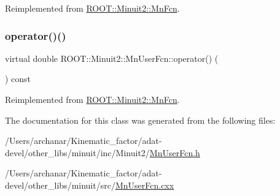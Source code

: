 Reimplemented from \mbox{\hyperlink{classROOT_1_1Minuit2_1_1MnFcn_a61a5f3cd53f1d7daa96bae19f4b1dbb6}{R\+O\+O\+T\+::\+Minuit2\+::\+Mn\+Fcn}}.

\mbox{\label{classROOT_1_1Minuit2_1_1MnUserFcn_aad007634c740a70ebb8f5acb0a7cfede}} 
\subsubsection{\texorpdfstring{operator()()}{operator()()}\hspace{0.1cm}{\footnotesize\ttfamily [3/3]}}
{\footnotesize\ttfamily virtual double R\+O\+O\+T\+::\+Minuit2\+::\+Mn\+User\+Fcn\+::operator() (\begin{DoxyParamCaption}\item[{const \mbox{\hyperlink{namespaceROOT_1_1Minuit2_a62ed97730a1ca8d3fbaec64a19aa11c9}{Mn\+Algebraic\+Vector}} \&}]{ }\end{DoxyParamCaption}) const\hspace{0.3cm}{\ttfamily [virtual]}}



Reimplemented from \mbox{\hyperlink{classROOT_1_1Minuit2_1_1MnFcn_a61a5f3cd53f1d7daa96bae19f4b1dbb6}{R\+O\+O\+T\+::\+Minuit2\+::\+Mn\+Fcn}}.



The documentation for this class was generated from the following files\+:\begin{DoxyCompactItemize}
\item 
/\+Users/archanar/\+Kinematic\+\_\+factor/adat-\/devel/other\+\_\+libs/minuit/inc/\+Minuit2/\mbox{\hyperlink{adat-devel_2other__libs_2minuit_2inc_2Minuit2_2MnUserFcn_8h}{Mn\+User\+Fcn.\+h}}\item 
/\+Users/archanar/\+Kinematic\+\_\+factor/adat-\/devel/other\+\_\+libs/minuit/src/\mbox{\hyperlink{adat-devel_2other__libs_2minuit_2src_2MnUserFcn_8cxx}{Mn\+User\+Fcn.\+cxx}}\end{DoxyCompactItemize}
